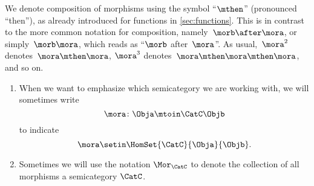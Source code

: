 \begin{remark}
    We denote composition of morphisms using the symbol ``$\mthen$'' (pronounced ``then''), as already introduced for functions in \cref{sec:functions}.
    This is in contrast to the more common notation for composition, namely~$\morb\after \mora$, or simply~$\morb \mora$, which reads as ``$\morb$ after~$\mora$''.
    As usual,~$\mora^2$ denotes~$\mora \mthen \mora$, $\mora^3$ denotes~$\mora \mthen \mora \mthen \mora$, and so on.
\end{remark}

\begin{remark}
    \begin{enumerate}
        \item When we want to emphasize which semicategory we are working with, we will sometimes write
              \begin{equation}
                  \mora \colon \Obja \mtoin\CatC \Objb
              \end{equation}
              to indicate
              \begin{equation}
                  \mora \setin \HomSet{\CatC}{\Obja}{\Objb}.
              \end{equation}
        \item Sometimes we will use the notation $\Mor_\CatC$ to denote the collection of all morphisms a semicategory $\CatC$.
    \end{enumerate}
\end{remark}


\begin{marginfigure}
    \centering
    \caption{}
    \label{fig:points-and-two-arrows-diagram}
\end{marginfigure}

\begin{marginfigure}
    \centering
    \caption{}
    \label{fig:points-and-composed-arrows-diagram}
\end{marginfigure}

